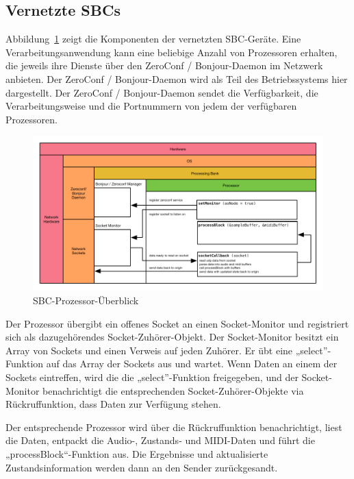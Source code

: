 \subsection{Vernetzte SBCs}

Abbildung~\ref{fig:arch_03} zeigt die Komponenten der vernetzten SBC-Geräte. Eine Verarbeitungsanwendung kann eine beliebige Anzahl von Prozessoren erhalten, die jeweils ihre Dienste über den ZeroConf / Bonjour-Daemon im Netzwerk anbieten. Der ZeroConf / Bonjour-Daemon wird als Teil des Betriebssystems hier dargestellt. Der ZeroConf / Bonjour-Daemon sendet die Verfügbarkeit, die Verarbeitungsweise und die Portnummern von jedem der verfügbaren Prozessoren.

\begin{figure}[H]
    \centering
    \includegraphics[width=\textwidth]{assets/architecture_03.pdf}
    \caption{SBC-Prozessor-Überblick}
    \label{fig:arch_03}
\end{figure}

Der Prozessor übergibt ein offenes Socket an einen Socket-Monitor und registriert sich als dazugehörendes Socket-Zuhörer-Objekt. Der Socket-Monitor besitzt ein Array von Sockets und einen Verweis auf jeden Zuhörer. Er übt eine „select”-Funktion auf das Array der Sockets aus und wartet. Wenn Daten an einem der Sockets eintreffen, wird die die „select”-Funktion freigegeben, und der Socket-Monitor benachrichtigt die entsprechenden Socket-Zuhörer-Objekte via Rückruffunktion, dass Daten zur Verfügung stehen.

Der entsprechende Prozessor wird über die Rückruffunktion benachrichtigt, liest die Daten, entpackt die Audio-, Zustands- und MIDI-Daten und führt die „processBlock“-Funktion aus. Die Ergebnisse und aktualisierte Zustandsinformation werden dann an den Sender zurückgesandt.

